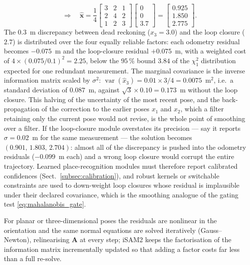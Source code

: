 \begin{example}
\begin{equation*}
\quad\Longrightarrow\quad
\widehat{\mathbf{x}}=\frac{1}{4}\begin{bmatrix}3&2&1\\2&4&2\\1&2&3\end{bmatrix}\begin{bmatrix}0\\0\\3.7\end{bmatrix}
=\begin{bmatrix}0.925\\1.850\\2.775\end{bmatrix}.
\end{equation*}
The $0.3$~m discrepancy between dead reckoning ($x_3=3.0$) and the loop closure ($2.7$) is distributed over the four equally reliable factors: each odometry residual becomes $-0.075$~m and the loop-closure residual $+0.075$~m, with a weighted cost of $4\times(0.075/0.1)^{2}=2.25$, below the $95\,\%$ bound $3.84$ of the $\chi^{2}_{1}$ distribution expected for one redundant measurement. The marginal covariance is the inverse information matrix scaled by $\sigma^{2}$: $\operatorname{var}(\widehat{x}_3)=0.01\times 3/4=0.0075$~m$^{2}$, i.e.\ a standard deviation of $0.087$~m, against $\sqrt{3}\times0.10=0.173$~m without the loop closure. This halving of the uncertainty of the most recent pose, and the back-propagation of the correction to the earlier poses $x_1$ and $x_2$, which a filter retaining only the current pose would not revise, is the whole point of smoothing over a filter. If the loop-closure module overstates its precision --- say it reports $\sigma=0.02$~m for the same measurement --- the solution becomes $(0.901,\,1.803,\,2.704)$: almost all of the discrepancy is pushed into the odometry residuals ($-0.099$~m each) and a wrong loop closure would corrupt the entire trajectory. Learned place-recognition modules must therefore report calibrated confidences (Sect.~\ref{subsec:calibration}), and robust kernels or switchable constraints are used to down-weight loop closures whose residual is implausible under their declared covariance, which is the smoothing analogue of the gating test \eqref{eq:mahalanobis_gate}.
\end{example}
For planar or three-dimensional poses the residuals are nonlinear in the orientation and the same normal equations are solved iteratively (Gauss--Newton), relinearising $\mathbf{A}$ at every step; iSAM2 \cite{kaess2012_isam2} keeps the factorisation of the information matrix incrementally updated so that adding a factor costs far less than a full re-solve.

